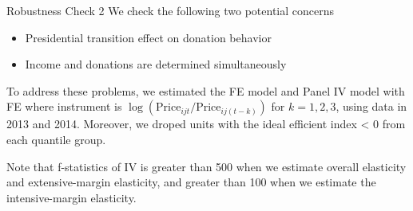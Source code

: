 \documentclass[
  ignorenonframetext,
]{beamer}
\providecommand{\tightlist}{%
  \setlength{\itemsep}{0pt}\setlength{\parskip}{0pt}}
\begin{document}
\begin{frame}{Robustness Check 2}
\protect\hypertarget{robustness-check-2-2}{}
We check the following two potential concerns

\begin{itemize}
\tightlist
\item
  Presidential transition effect on donation behavior
\item
  Income and donations are determined simultaneously
\end{itemize}

To address these problems, we estimated the FE model and Panel IV model
with FE where instrument is
\(\log(\text{Price}_{ijt}/\text{Price}_{ij(t-k)})\) for \(k = 1, 2, 3\),
using data in 2013 and 2014. Moreover, we droped units with the ideal
efficient index \textless{} 0 from each quantile group.

Note that f-statistics of IV is greater than 500 when we estimate
overall elasticity and extensive-margin elasticity, and greater than 100
when we estimate the intensive-margin elasticity.
\end{frame}
\end{document}
